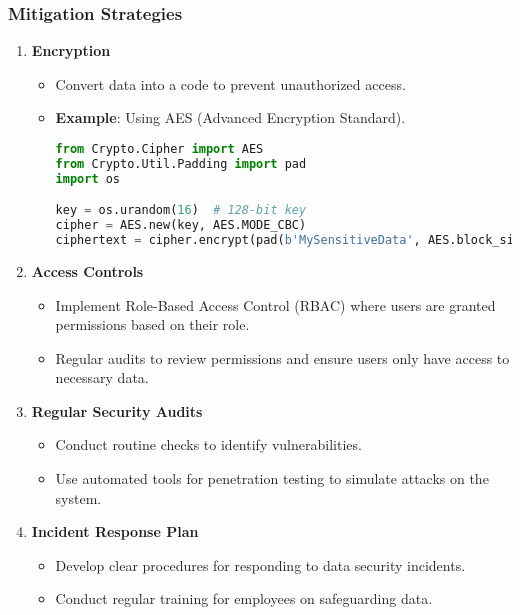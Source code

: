 \documentclass[aspectratio=169]{beamer}
\begin{document}
\begin{frame}[fragile]
    \frametitle{Mitigation Strategies}
    \begin{enumerate}
        \item \textbf{Encryption}
            \begin{itemize}
                \item Convert data into a code to prevent unauthorized access.
                \item \textbf{Example}: Using AES (Advanced Encryption Standard).
                \begin{lstlisting}[language=Python]
from Crypto.Cipher import AES
from Crypto.Util.Padding import pad
import os

key = os.urandom(16)  # 128-bit key
cipher = AES.new(key, AES.MODE_CBC)
ciphertext = cipher.encrypt(pad(b'MySensitiveData', AES.block_size))
                \end{lstlisting}
            \end{itemize}
        
        \item \textbf{Access Controls}
            \begin{itemize}
                \item Implement Role-Based Access Control (RBAC) where users are granted permissions based on their role.
                \item Regular audits to review permissions and ensure users only have access to necessary data.
            \end{itemize}

        \item \textbf{Regular Security Audits}
            \begin{itemize}
                \item Conduct routine checks to identify vulnerabilities.
                \item Use automated tools for penetration testing to simulate attacks on the system.
            \end{itemize}

        \item \textbf{Incident Response Plan}
            \begin{itemize}
                \item Develop clear procedures for responding to data security incidents.
                \item Conduct regular training for employees on safeguarding data.
            \end{itemize}
    \end{enumerate}
\end{frame}
\end{document}
